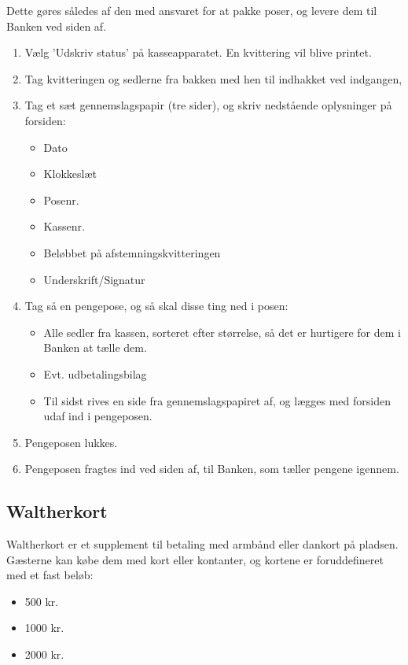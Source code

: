 Dette gøres således af den med ansvaret for at pakke poser, og levere dem til Banken ved siden af.
\begin{enumerate}
  \item Vælg 'Udskriv status' på kasseapparatet. En kvittering vil blive printet.
  \item Tag kvitteringen og sedlerne fra bakken med hen til indhakket ved indgangen, 
  \item Tag et sæt gennemslagspapir (tre sider), og skriv nedstående oplysninger på forsiden:
  \begin{itemize}
    \item Dato
    \item Klokkeslæt
    \item Posenr.
    \item Kassenr.
    \item Beløbbet på afstemningskvitteringen
    \item Underskrift/Signatur
  \end{itemize}
  \item Tag så en pengepose, og så skal disse ting ned i posen:
  \begin{itemize}
    \item Alle sedler fra kassen, sorteret efter størrelse, så det er hurtigere for dem i Banken at 
    tælle dem. 
    \item Evt. udbetalingsbilag
    \item Til sidst rives en side fra gennemslagspapiret af, og lægges med forsiden udaf ind i pengeposen.
  \end{itemize}
  \item Pengeposen lukkes.
  \item Pengeposen fragtes ind ved siden af, til Banken, som tæller pengene igennem.
\end{enumerate}

\subsection{Waltherkort}
Waltherkort er et supplement til betaling med armbånd eller dankort på pladsen.
Gæsterne kan købe dem med kort eller kontanter, og kortene er foruddefineret med et fast beløb:
\begin{itemize}
  \item 500 kr.
  \item 1000 kr.
  \item 2000 kr.
\end{itemize} 

